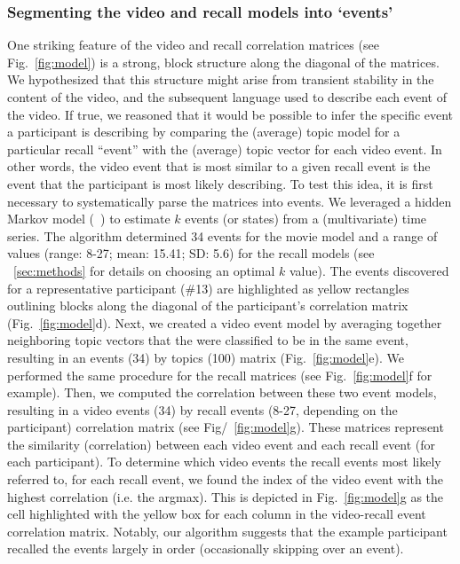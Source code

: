 \documentclass{article}
\begin{document}
{\subsubsection{Segmenting the video and recall models into `events'}
One striking feature of the video and recall correlation matrices (see Fig.~\ref{fig:model}) is a strong, block structure along the diagonal of the matrices.  We hypothesized that this structure might arise from transient stability in the content of the video, and the subsequent language used to describe each event of the video. If true, we reasoned that it would be possible to infer the specific event a participant is describing by comparing the (average) topic model for a particular recall ``event'' with the (average) topic vector for each video event. In other words, the video event that is most similar to a given recall event is the event that the participant is most likely describing.  To test this idea, it is first necessary to systematically parse the matrices into events.  We leveraged a hidden Markov model (~\citep{BaldEtal17}) to estimate $k$ events (or states) from a (multivariate) time series. The algorithm determined 34 events for the movie model and a range of values (range: 8-27; mean: 15.41; SD: 5.6) for the recall models (see ~\ref{sec:methods} for details on choosing an optimal $k$ value).  The events discovered for a representative participant (\#13) are highlighted as yellow rectangles outlining blocks along the diagonal of the participant's correlation matrix (Fig.~\ref{fig:model}d). Next, we created a video event model by averaging together neighboring topic vectors that the were classified to be in the same event, resulting in an events (34) by topics (100) matrix (Fig.~\ref{fig:model}e).  We performed the same procedure for the recall matrices (see Fig.~\ref{fig:model}f for example). Then, we computed the correlation between these two event models, resulting in a video events (34) by recall events (8-27, depending on the participant) correlation matrix (see Fig/~\ref{fig:model}g). These matrices represent the similarity (correlation) between each video event and each recall event (for each participant). To determine which video events the recall events most likely referred to, for each recall event, we found the index of the video event with the highest correlation (i.e. the argmax).  This is depicted in Fig.~\ref{fig:model}g as the cell highlighted with the yellow box for each column in the video-recall event correlation matrix. Notably, our algorithm suggests that the example participant recalled the events largely in order (occasionally skipping over an event).

}
\end{document}
